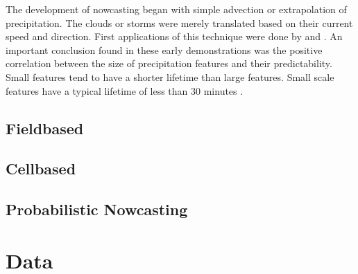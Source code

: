 \documentclass[11pt,twoside,a4paper,fleqn,x11names]{report}
\numberwithin{equation}{chapter}
\numberwithin{figure}{chapter}
\numberwithin{table}{chapter}
\begin{document}
The development of nowcasting began with simple advection or extrapolation of precipitation. The clouds or storms were merely translated based on their current speed and direction. First applications of this technique were done by \cite{hilst1960} and \cite{Noel}. An important conclusion found in these early demonstrations was the positive correlation between the size of precipitation features and their predictability. Small features tend to have a shorter lifetime than large features. Small scale features have a typical lifetime of less than 30 minutes \cite{Sene2009}.

\section{Fieldbased}
\section{Cellbased}
\section{Probabilistic Nowcasting}
\chapter{Data}
\label{chap:data}
\end{document}
